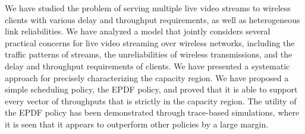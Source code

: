\documentclass[10pt,nocopyrightspace]{sigplan-proc-varsize-1in}
\begin{document}
We have studied the problem of serving multiple live video streams to wireless clients with various delay and throughput requirements, as well as heterogeneous link reliabilities. We have analyzed a model that jointly considers several practical concerns for live video streaming over wireless networks, including the traffic patterns of streams, the unreliabilities of wireless transmissions, and the delay and throughput requirements of clients. We have presented a systematic approach for precisely characterizing the capacity region. We have proposed a simple scheduling policy, the EPDF policy, and proved that it is able to support every vector of throughputs that is strictly in the capacity region. The utility of the EPDF policy has been demonstrated through trace-based simulations, where it is seen that it appears to outperform other policies by a large margin.
 



\end{document}
